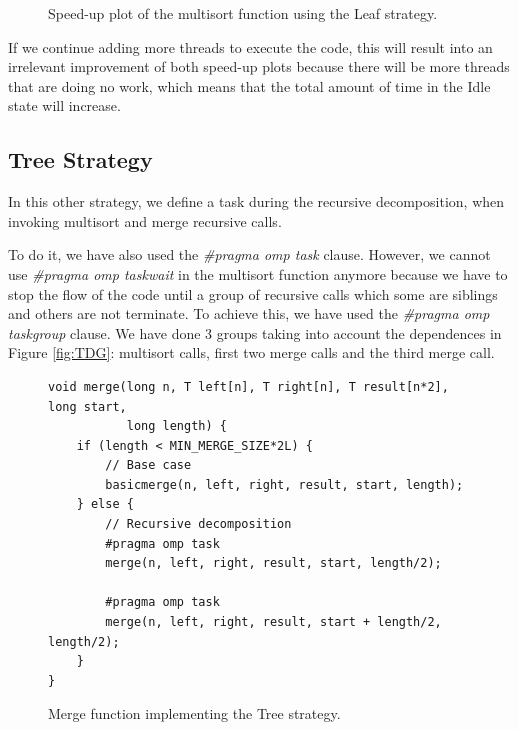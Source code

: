 \documentclass[12pt, a4paper]{article}
\begin{document}
\begin{figure}[H]
\begin{minipage}[b]{0.4\linewidth}
  \caption{Speed-up plot of the multisort function using the Leaf strategy.}
  \label{fig:mandel-omp-10000-strong-21-speedup}
\end{minipage}
\end{figure}

If we continue adding more threads to execute the code, this will result into an irrelevant improvement of both speed-up plots because there will be more threads that are doing no work, which means that the total amount of time in the Idle state will increase.

\subsection{Tree Strategy}

In this other strategy, we define a task during the recursive decomposition, when invoking multisort and merge recursive calls.

To do it, we have also used the \textit{\#pragma omp task} clause. However, we cannot use \textit{\#pragma omp taskwait} in the multisort function anymore because we have to stop the flow of the code until a group of recursive calls which some are siblings and others are not terminate. To achieve this, we have used the \textit{\#pragma omp taskgroup} clause. We have done 3 groups taking into account the dependences in Figure \ref{fig:TDG}: multisort calls, first two merge calls and the third merge call.

\begin{figure}[H]
\begin{lstlisting}
void merge(long n, T left[n], T right[n], T result[n*2], long start,
	 	   long length) {
    if (length < MIN_MERGE_SIZE*2L) {
        // Base case
        basicmerge(n, left, right, result, start, length);
    } else {
        // Recursive decomposition
        #pragma omp task
        merge(n, left, right, result, start, length/2);
        
        #pragma omp task
        merge(n, left, right, result, start + length/2, length/2);
    }
}
\end{lstlisting}

\caption{Merge function implementing the Tree strategy.}
\end{figure}
\end{document}
